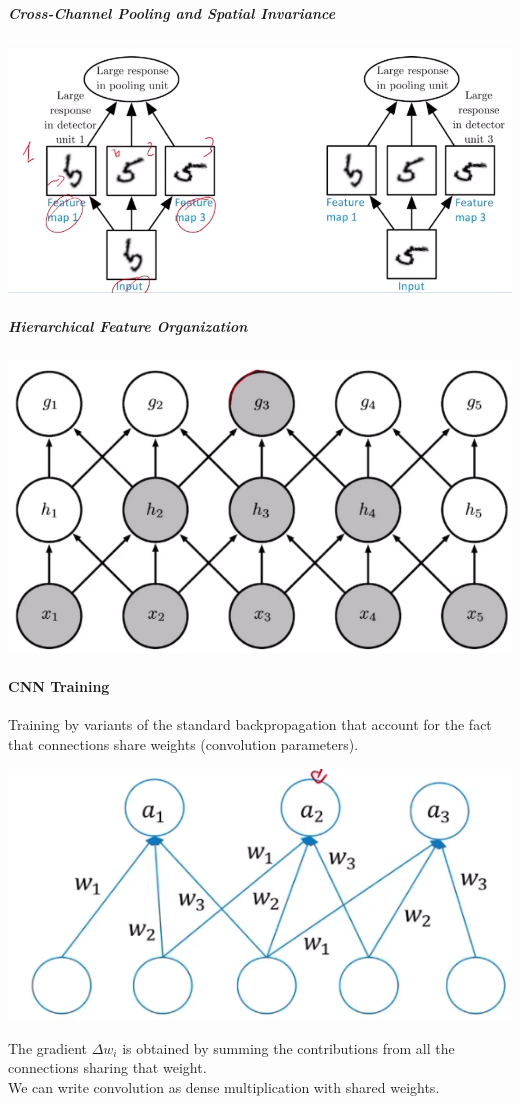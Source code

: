 \documentclass[10pt]{report}
\begin{document}
\subparagraph{Cross-Channel Pooling and Spatial Invariance}
\begin{center}
	\includegraphics[scale=0.5]{60.png}
\end{center}
\subparagraph{Hierarchical Feature Organization}
\begin{center}
	\includegraphics[scale=0.5]{61.png}
\end{center}
\paragraph{CNN Training}
Training by variants of the standard backpropagation that account for the fact that connections share weights (convolution parameters).
\begin{multicols}{2}
\begin{center}
	\includegraphics[scale=0.5]{62.png}
\end{center}
The gradient $\Delta w_i$ is obtained by summing the contributions from all the connections sharing that weight.\\
We can write convolution as dense multiplication with shared weights.
\end{multicols}
\end{document}
